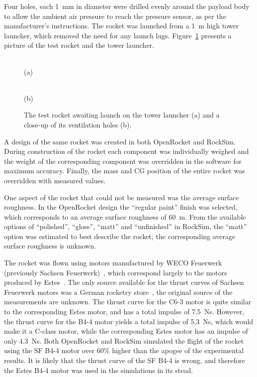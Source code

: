 Four holes, each 1~mm in diameter were drilled evenly around the
payload body to allow the ambient air pressure to reach the pressure
sensor, as per the manufacturer's instructions.  The rocket was
launched from a 1~m high tower launcher, which removed the need for
any launch lugs.  Figure~\ref{fig-rocket-picture} presents a
picture of the test rocket and the tower launcher.


\begin{figure}
\centering
\parbox{75mm}{\centering  %
 \\ (a)}
\hspace{10mm}
\parbox{35mm}{\centering  %
 \\ (b)}
%
\caption{The test rocket awaiting launch on the tower launcher (a) and
  a close-up of its ventilation holes (b).}
\label{fig-rocket-picture}
\end{figure}


A design of the same rocket was created in both OpenRocket and
RockSim.  During construction of the rocket each component was
individually weighed and the weight of the corresponding component
was overridden in the software for maximum accuracy.  Finally, the 
mass and CG position of the entire rocket was overridden with measured
values.

One aspect of the rocket that could not be measured was the average
surface roughness.  In the OpenRocket design the ``regular paint''
finish was selected, which corresponds to an average surface roughness
of 60~\textmu m.  From the available options of ``polished'',
``gloss'', ``matt'' and ``unfinished'' in RockSim, the ``matt'' option
was estimated to best describe the rocket; the corresponding
average surface roughness is unknown.

The rocket was flown using motors manufactured by WECO Feuerwerk
(previously Sachsen Feuerwerk)~\cite{weco-feuerwerk}, which correspond
largely to the motors produced by Estes~\cite{estes}.  The only source
available for the thrust curves of Sachsen Feuerwerk motors was a
German rocketry store~\cite{sf-thrustcurves}, the original source of
the measurements are unknown.  The thrust curve for the C6-3 motor is
quite similar to the corresponding Estes motor, and has a total impulse
of 7.5~Ns.  However, the thrust curve for the B4-4 motor yields a
total impulse of 5.3~Ns, which would make it a C-class motor, while
the corresponding Estes motor has an impulse of only 4.3~Ns.  Both
OpenRocket and RockSim simulated the flight of the rocket using the
SF B4-4 motor over 60\% higher than the apogee of the experimental
results.  It is likely that the thrust curve of the SF B4-4 is wrong,
and therefore the Estes B4-4 motor was used in the simulations in its
stead.


